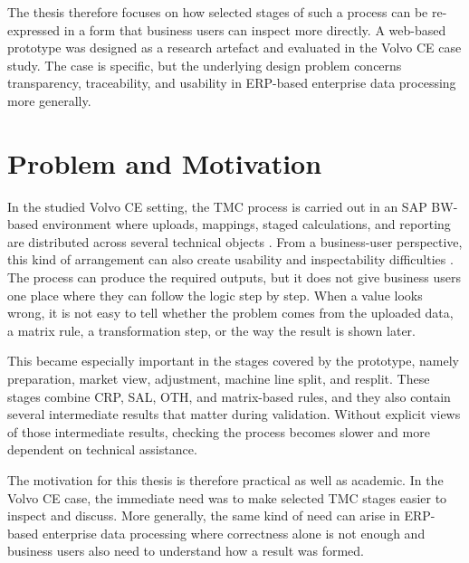 The thesis therefore focuses on how selected stages of such a process can be re-expressed in a form that business users can inspect more directly. A web-based prototype was designed as a research artefact and evaluated in the Volvo CE case study. The case is specific, but the underlying design problem concerns transparency, traceability, and usability in ERP-based enterprise data processing more generally.





\section{Problem and Motivation}
In the studied Volvo CE setting, the TMC process is carried out in an SAP BW-based environment where uploads, mappings, staged calculations, and reporting are distributed across several technical objects \cite{weber2022sap}. From a business-user perspective, this kind of arrangement can also create usability and inspectability difficulties \cite{wong2016sap}. The process can produce the required outputs, but it does not give business users one place where they can follow the logic step by step. When a value looks wrong, it is not easy to tell whether the problem comes from the uploaded data, a matrix rule, a transformation step, or the way the result is shown later.

This became especially important in the stages covered by the prototype, namely preparation, market view, adjustment, machine line split, and resplit. These stages combine CRP, SAL, OTH, and matrix-based rules, and they also contain several intermediate results that matter during validation. Without explicit views of those intermediate results, checking the process becomes slower and more dependent on technical assistance.

The motivation for this thesis is therefore practical as well as academic. In the Volvo CE case, the immediate need was to make selected TMC stages easier to inspect and discuss. More generally, the same kind of need can arise in ERP-based enterprise data processing where correctness alone is not enough and business users also need to understand how a result was formed.











